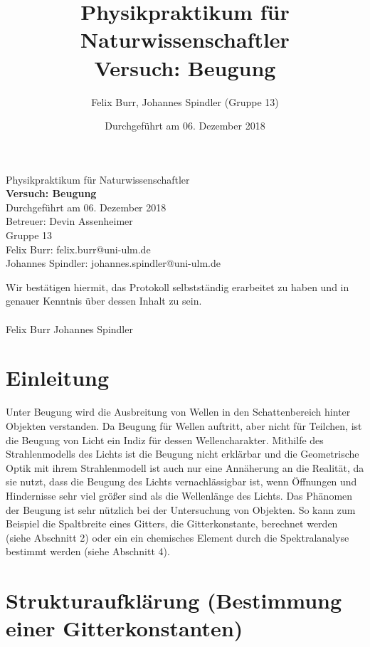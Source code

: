\documentclass{scrartcl}
\title{Physikpraktikum für Naturwissenschaftler \\ Versuch: Beugung}
\author{Felix Burr, Johannes Spindler (Gruppe 13)}
\date{Durchgeführt am 06. Dezember 2018}
\begin{document}
\begin{titlepage}
  \begin{center}
    \vspace*{1cm}
    \LARGE
    Physikpraktikum für Naturwissenschaftler \\
    \vspace*{1cm}
    \Huge
    \textbf{Versuch: Beugung} \\
    \vspace*{0.3cm}
    \Large
    Durchgeführt am 06. Dezember 2018 \\
    Betreuer: Devin Assenheimer \\
    \vspace*{2.5cm}
    Gruppe 13 \\
    Felix Burr: felix.burr@uni-ulm.de \\
    Johannes Spindler: johannes.spindler@uni-ulm.de \\
    \vfill 
  \end{center}
  Wir bestätigen hiermit, das Protokoll selbstständig erarbeitet zu haben und in genauer Kenntnis über dessen Inhalt zu sein. \\
  \vspace*{0.8cm}
  \\
  Felix Burr
  \hfill
  Johannes Spindler
\end{titlepage}
\pagebreak
\tableofcontents


\pagebreak

\section{Einleitung}
Unter Beugung wird die Ausbreitung von Wellen in den Schattenbereich hinter Objekten verstanden. Da Beugung für Wellen auftritt, aber nicht für Teilchen, ist die Beugung von Licht ein Indiz für dessen Wellencharakter. Mithilfe des Strahlenmodells des Lichts ist die Beugung nicht erklärbar und die Geometrische Optik mit ihrem Strahlenmodell ist auch nur eine Annäherung an die Realität, da sie nutzt, dass die Beugung des Lichts vernachlässigbar ist, wenn Öffnungen und Hindernisse sehr viel größer sind als die Wellenlänge des Lichts. Das Phänomen der Beugung ist sehr nützlich bei der Untersuchung von Objekten. So kann zum Beispiel die Spaltbreite eines Gitters, die Gitterkonstante, berechnet werden (siehe Abschnitt 2) oder ein ein chemisches Element durch die Spektralanalyse bestimmt werden (siehe Abschnitt 4).

\section{Strukturaufklärung (Bestimmung einer Gitterkonstanten)}
\end{document}
